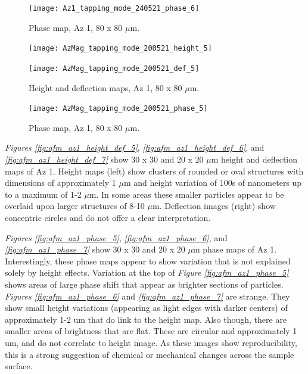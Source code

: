 \begin{figure}[H]
\centering
  \texttt{[image: Az1\_tapping\_mode\_240521\_phase\_6]}
\caption[Phase map, Az 1]{Phase map, Az 1, 80 x 80 $\mu$m.}
\label{fig:afm_az1_phase_3}
\end{figure}


\begin{figure}[H]
\centering
\begin{minipage}{.45\textwidth}
  \centering
  \texttt{[image: AzMag\_tapping\_mode\_200521\_height\_5]}
\end{minipage}
\begin{minipage}{.45\textwidth}
  \centering
  \texttt{[image: AzMag\_tapping\_mode\_200521\_def\_5]}
\end{minipage}
\caption[Height and deflection maps, Az 1]{Height and deflection maps, Az 1, 80 x 80 $\mu$m.}
\label{fig:afm_az1_height_def_4}
\end{figure}

\begin{figure}[H]
\centering
  \texttt{[image: AzMag\_tapping\_mode\_200521\_phase\_5]}
\caption[Phase map, Az 1]{Phase map, Az 1, 80 x 80 $\mu$m.}
\label{fig:afm_az1_phase_4}
\end{figure}


\textit{Figures \ref{fig:afm_az1_height_def_5}}, \textit{\ref{fig:afm_az1_height_def_6}}, and \textit{\ref{fig:afm_az1_height_def_7}} show 30 x 30 and 20 x 20 $\mu$m height and deflection maps of Az 1. Height maps (left) show clusters of rounded or oval structures with dimensions of approximately 1 $\mu$m and height variation of 100s of nanometers up to a maximum of 1-2 $\mu$m. In some areas these smaller particles appear to be overlaid upon larger structures of 8-10 $\mu$m. Deflection images (right) show concentric circles and do not offer a clear interpretation.


\textit{Figures \ref{fig:afm_az1_phase_5}}, \textit{\ref{fig:afm_az1_phase_6}}, and \textit{\ref{fig:afm_az1_phase_7}} show 30 x 30 and 20 x 20 $\mu$m phase maps of Az 1. Interestingly, these phase maps appear to show variation that is not explained solely by height effects. Variation at the top of \textit{Figure \ref{fig:afm_az1_phase_5}} shows areas of large phase shift that appear as brighter sections of particles. \textit{Figures \ref{fig:afm_az1_phase_6}} and \textit{\ref{fig:afm_az1_phase_7}} are strange. They show small height variations (appearing as light edges with darker centers) of approximately 1-2 um that do link to the height map. Also though, there are smaller areas of brightness that are flat. These are circular and approximately 1 um, and do not correlate to height image. As these images show reproducibility, this is a strong suggestion of chemical or mechanical changes across the sample surface. 


